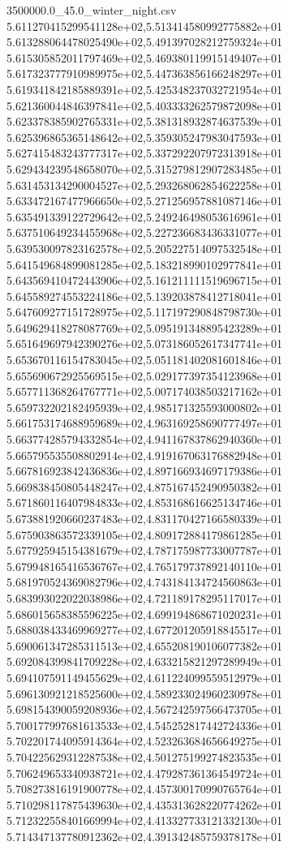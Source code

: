 \begin{filecontents*}{3500000.0_45.0_winter_night.csv}
5.611270415299541128e+02,5.513414580992775882e+01
5.613288064478025490e+02,5.491397028212759324e+01
5.615305852011797469e+02,5.469380119915149407e+01
5.617323777910989975e+02,5.447363856166248297e+01
5.619341842185889391e+02,5.425348237032721954e+01
5.621360044846397841e+02,5.403333262579872098e+01
5.623378385902765331e+02,5.381318932874637539e+01
5.625396865365148642e+02,5.359305247983047593e+01
5.627415483243777317e+02,5.337292207972313918e+01
5.629434239548658070e+02,5.315279812907283485e+01
5.631453134290004527e+02,5.293268062854622258e+01
5.633472167477966650e+02,5.271256957881087146e+01
5.635491339122729642e+02,5.249246498053616961e+01
5.637510649234455968e+02,5.227236683436331077e+01
5.639530097823162578e+02,5.205227514097532548e+01
5.641549684899081285e+02,5.183218990102977841e+01
5.643569410472443906e+02,5.161211111519696715e+01
5.645589274553224186e+02,5.139203878412718041e+01
5.647609277151728975e+02,5.117197290848798730e+01
5.649629418278087769e+02,5.095191348895423289e+01
5.651649697942390276e+02,5.073186052617347741e+01
5.653670116154783045e+02,5.051181402081601846e+01
5.655690672925569515e+02,5.029177397354123968e+01
5.657711368264767771e+02,5.007174038503217162e+01
5.659732202182495939e+02,4.985171325593000802e+01
5.661753174688959689e+02,4.963169258690777497e+01
5.663774285794332854e+02,4.941167837862940360e+01
5.665795535508802914e+02,4.919167063176882948e+01
5.667816923842436836e+02,4.897166934697179386e+01
5.669838450805448247e+02,4.875167452490950382e+01
5.671860116407984833e+02,4.853168616625134746e+01
5.673881920660237483e+02,4.831170427166580339e+01
5.675903863572339105e+02,4.809172884179861285e+01
5.677925945154381679e+02,4.787175987733007787e+01
5.679948165416536767e+02,4.765179737892140110e+01
5.681970524369082796e+02,4.743184134724560863e+01
5.683993022022038986e+02,4.721189178295117017e+01
5.686015658385596225e+02,4.699194868671020231e+01
5.688038433469969277e+02,4.677201205918845517e+01
5.690061347285311513e+02,4.655208190106077382e+01
5.692084399841709228e+02,4.633215821297289949e+01
5.694107591149455629e+02,4.611224099559512979e+01
5.696130921218525600e+02,4.589233024960230978e+01
5.698154390059208936e+02,4.567242597566473705e+01
5.700177997681613533e+02,4.545252817442724336e+01
5.702201744095914364e+02,4.523263684656649275e+01
5.704225629312287538e+02,4.501275199274823535e+01
5.706249653340938721e+02,4.479287361364549724e+01
5.708273816191900778e+02,4.457300170990765764e+01
5.710298117875439630e+02,4.435313628220774262e+01
5.712322558401669994e+02,4.413327733121332130e+01
5.714347137780912362e+02,4.391342485759378178e+01

\end{filecontents*}
